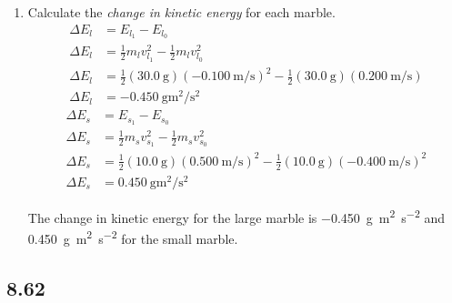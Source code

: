 \documentclass{article}
\begin{document}
\begin{enumerate}[label = \textbf{(\alph*)}]
		\begin{align*}
			\Delta P_s & = P_{s_1} - P_{s_0} \\
			\Delta P_s & = m_sv_{s_1} - m_sv_{s_0} \\
			\Delta P_s & = (\SI{10.0}{\gram})(\SI{0.500}{\meter \per \second}) - (\SI{10.0}{\gram})(\SI{-0.400}{\meter \per \second}) \\
			\Delta P_s & = \SI{9.00}{\gram \meter \per \second}
		\end{align*}
		\begin{mdframed}
			The change in momentum energy for the large marble is \SI{-9.00}{\gram \meter \per \second} and \SI{9.00}{\gram \meter \per \second} for the small marble.
		\end{mdframed}
	\item Calculate the \textit{change in kinetic energy} for each marble.
		\begin{align*}
			\Delta E_l & = E_{l_1} - E_{l_0} \\
			\Delta E_l & = \frac{1}{2}m_lv_{l_1}^2 - \frac{1}{2}m_lv_{l_0}^2 \\
			\Delta E_l & = \frac{1}{2}(\SI{30.0}{\gram})(\SI{-0.100}{\meter \per \second})^2 - \frac{1}{2}(\SI{30.0}{\gram})(\SI{0.200}{\meter \per \second}) \\
			\Delta E_l & = \SI{-0.450}{\gram \meter \squared \per \second \squared}
		\end{align*}
		\begin{align*}
			\Delta E_s & = E_{s_1} - E_{s_0} \\
			\Delta E_s & = \frac{1}{2}m_sv_{s_1}^2 - \frac{1}{2}m_sv_{s_0}^2 \\
			\Delta E_s & = \frac{1}{2}(\SI{10.0}{\gram})(\SI{0.500}{\meter \per \second})^2 - \frac{1}{2}(\SI{10.0}{\gram})(\SI{-0.400}{\meter \per \second})^2 \\
			\Delta E_s & = \SI{0.450}{\gram \meter \squared \per \second \squared}
		\end{align*}
		\begin{mdframed}
			The change in kinetic energy for the large marble is \SI{-0.450}{\gram \meter \squared \per \second \squared} and \SI{0.450}{\gram \meter \squared \per \second \squared} for the small marble.
		\end{mdframed}
\end{enumerate}

\subsection{8.62}
\end{document}
